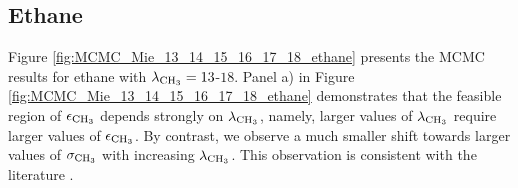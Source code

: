 \documentclass[journal=jctc,manuscript=article]{achemso}
\begin{document}
\subsection{Ethane} \label{Ethane}


Figure \ref{fig:MCMC_Mie_13_14_15_16_17_18_ethane} presents the MCMC results for ethane with $\lambda_{\rm CH_3} =13$-$18$. Panel a) in Figure \ref{fig:MCMC_Mie_13_14_15_16_17_18_ethane} demonstrates that the feasible region of $\epsilon_{\rm CH_3}$ depends strongly on $\lambda_{\rm CH_3}$, namely, larger values of $\lambda_{\rm CH_3}$ require larger values of $\epsilon_{\rm CH_3}$. By contrast, we observe a much smaller shift towards larger values of $\sigma_{\rm CH_3}$ with increasing $\lambda_{\rm CH_3}$. This observation is consistent with the literature \cite{Mie}.
\end{document}
